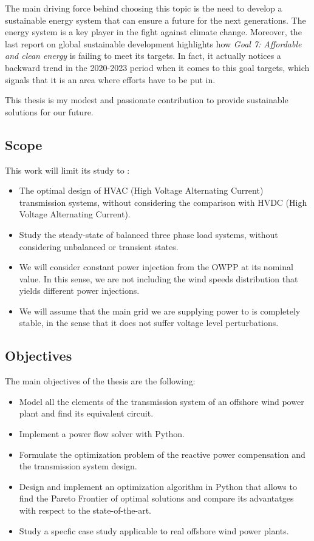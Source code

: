 \documentclass[a4paper,11pt, titlepage, twoside]{article}
\begin{document}
The main driving force behind choosing this topic is the need to develop a sustainable energy system that can
ensure a future for the next generations. The energy system is a key player in the fight against climate change. Moreover, the last
report on global sustainable development \cite{SustGoal7} highlights how \textit{Goal 7: Affordable and clean energy} is failing to meet its targets.
In fact, it actually notices a backward trend in the 2020-2023 period when it comes to this goal targets, which signals that it is an area where efforts
have to be put in. \par

This thesis is my modest and passionate contribution to provide sustainable solutions for our future.

\subsection{Scope}

This work will limit its study to :
\begin{itemize}
    \item The optimal design of HVAC (High Voltage Alternating Current) transmission systems, without considering the comparison with HVDC (High Voltage Alternating Current).
    \item Study the steady-state of balanced three phase load systems, without considering unbalanced or transient states.
    \item We will consider constant power injection from the OWPP at its nominal value. In this sense, we are not including the wind speeds distribution that yields different 
    power injections.
    \item We will assume that the main grid we are supplying power to is completely stable, in the sense that it does not suffer voltage level perturbations.
\end{itemize}
\subsection{Objectives}\label{objectives}

The main objectives of the thesis are the following:
\begin{itemize}
    \item Model all the elements of the transmission system of an offshore wind power plant and find its equivalent circuit.
    \item Implement a power flow solver with Python.
    \item Formulate the optimization problem of the reactive power compensation and the transmission system design. 
    \item Design and implement an optimization algorithm in Python that allows to find the Pareto Frontier of optimal solutions and compare its advantatges with respect to the state-of-the-art.
    \item Study a specfic case study applicable to real offshore wind power plants.
  \end{itemize}
\end{document}
